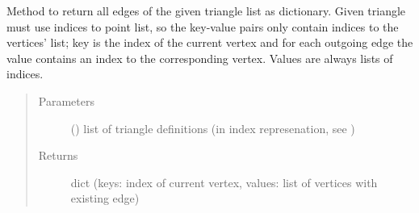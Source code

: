 \documentclass[letterpaper,10pt,english]{sphinxmanual}
\begin{document}
\begin{fulllineitems}
\begin{description}
\end{description}

\end{fulllineitems}


\begin{fulllineitems}
\label{\detokenize{pk_src.misc:pk_src.misc.getSkew}}
\end{fulllineitems}


\begin{fulllineitems}
\label{\detokenize{pk_src.misc:pk_src.misc.getTriangleEdges}}
Method to return all edges of the given triangle list as dictionary. Given triangle must use indices to point list, so the key-value pairs only contain indices to the vertices’ list; key is the index of the current vertex and for each outgoing edge the value contains an index to the corresponding vertex. Values are always lists of indices.
\begin{quote}\begin{description}
\item[{Parameters}] \leavevmode
{} (\sphinxstyleliteralemphasis{{[}}\sphinxstyleliteralemphasis{{[}}\sphinxstyleliteralemphasis{, }\sphinxstyleliteralemphasis{, }\sphinxstyleliteralemphasis{{]}}\sphinxstyleliteralemphasis{, }\sphinxstyleliteralemphasis{{[}}\sphinxstyleliteralemphasis{, }\sphinxstyleliteralemphasis{, }\sphinxstyleliteralemphasis{{]}}\sphinxstyleliteralemphasis{, }\sphinxstyleliteralemphasis{{]}}) \textendash{} list of triangle definitions (in index represenation, see )

\item[{Returns}] \leavevmode
dict (keys: index of current vertex, values: list of vertices with existing edge)


\end{description}
\end{quote}
\end{fulllineitems}
\end{document}
